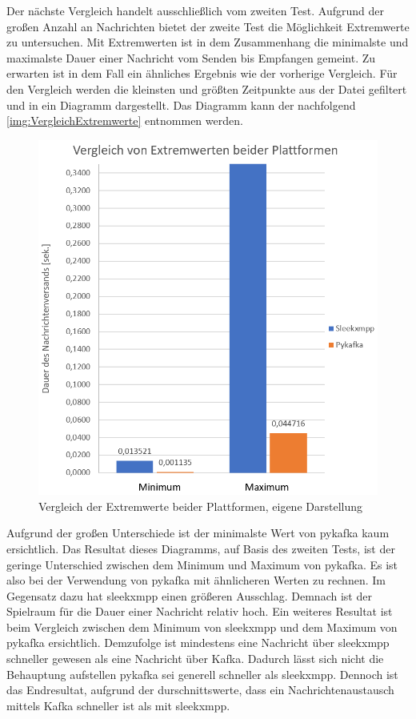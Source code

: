 \documentclass[a4paper,titlepage,halfparskip,12pt]{scrreprt}
\begin{document}
\begin{onehalfspacing}
Der nächste Vergleich handelt ausschließlich vom zweiten Test. Aufgrund der großen Anzahl an Nachrichten bietet der zweite Test die Möglichkeit Extremwerte zu untersuchen. Mit Extremwerten ist in dem Zusammenhang die minimalste und maximalste Dauer einer Nachricht vom Senden bis Empfangen gemeint. Zu erwarten ist in dem Fall ein ähnliches Ergebnis wie der vorherige Vergleich. Für den Vergleich werden die kleinsten und größten Zeitpunkte aus der Datei gefiltert und in ein Diagramm dargestellt. Das Diagramm kann der nachfolgend \autoref{img:VergleichExtremwerte} entnommen werden.
\begin{figure}[h]
	\centering
	\includegraphics[scale=0.8]{images/VergleichExtremwerte}
	\caption{Vergleich der Extremwerte beider Plattformen, eigene Darstellung}
	\label{img:VergleichExtremwerte}
\end{figure}
Aufgrund der großen Unterschiede ist der minimalste Wert von pykafka kaum ersichtlich. Das Resultat dieses Diagramms, auf Basis des zweiten Tests, ist der geringe Unterschied zwischen dem Minimum und Maximum von pykafka. Es ist also bei der Verwendung von pykafka mit ähnlicheren Werten zu rechnen. Im Gegensatz dazu hat sleekxmpp einen größeren Ausschlag. Demnach ist der Spielraum für die Dauer einer Nachricht relativ hoch. Ein weiteres Resultat ist beim Vergleich zwischen dem Minimum von sleekxmpp und dem Maximum von pykafka ersichtlich. Demzufolge ist mindestens eine Nachricht über sleekxmpp schneller gewesen als eine Nachricht über Kafka. Dadurch lässt sich nicht die Behauptung aufstellen pykafka sei generell schneller als sleekxmpp. Dennoch ist das Endresultat, aufgrund der durschnittswerte, dass ein Nachrichtenaustausch mittels Kafka schneller ist als mit sleekxmpp.



\end{onehalfspacing}
\end{document}
